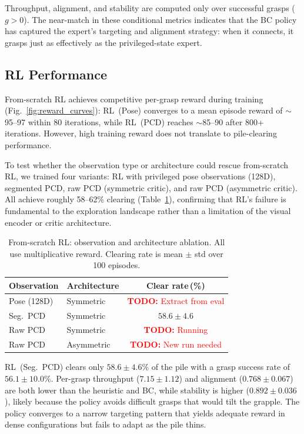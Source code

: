 \documentclass[conference]{IEEEtran}
\newcommand{\TODO}[1]{\textcolor{red}{\textbf{TODO:} #1}}
\begin{document}
Throughput, alignment, and stability are computed only over successful grasps ($g > 0$).
The near-match in these conditional metrics indicates that the BC policy has captured the expert's targeting and alignment strategy: when it connects, it grasps just as effectively as the privileged-state expert.

\subsection{RL Performance}
\label{sec:rl_perf}
From-scratch RL achieves competitive per-grasp reward during training (Fig.~\ref{fig:reward_curves}): RL~(Pose) converges to a mean episode reward of $\sim$95--97 within 80 iterations, while RL~(PCD) reaches $\sim$85--90 after 800+ iterations.
However, high training reward does not translate to pile-clearing performance.

To test whether the observation type or architecture could rescue from-scratch RL, we trained four variants: RL with privileged pose observations (128D), segmented PCD, raw PCD (symmetric critic), and raw PCD (asymmetric critic).
All achieve roughly 58--62\% clearing (Table~\ref{tab:rl_ablation}), confirming that RL's failure is fundamental to the exploration landscape rather than a limitation of the visual encoder or critic architecture.

\begin{table}[t]
\centering
\caption{From-scratch RL: observation and architecture ablation. All use multiplicative reward. Clearing rate is mean $\pm$ std over 100 episodes.}
\label{tab:rl_ablation}
\setlength{\tabcolsep}{4pt}
\begin{tabular}{@{}llc@{}}
\toprule
Observation & Architecture & Clear rate\,(\%) \\
\midrule
Pose (128D) & Symmetric & \TODO{Extract from eval} \\
Seg.\ PCD   & Symmetric & $58.6 \pm 4.6$ \\
Raw PCD     & Symmetric & \TODO{Running} \\
Raw PCD     & Asymmetric & \TODO{New run needed} \\
\bottomrule
\end{tabular}
\end{table}

RL~(Seg.\ PCD) clears only $58.6 \pm 4.6$\% of the pile with a grasp success rate of $56.1 \pm 10.0$\%.
Per-grasp throughput ($7.15 \pm 1.12$) and alignment ($0.768 \pm 0.067$) are both lower than the heuristic and BC, while stability is higher ($0.892 \pm 0.036$), likely because the policy avoids difficult grasps that would tilt the grapple.
The policy converges to a narrow targeting pattern that yields adequate reward in dense configurations but fails to adapt as the pile thins.
\end{document}
